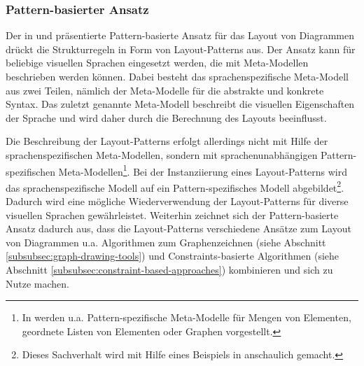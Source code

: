 


\subsubsection{Pattern-basierter Ansatz}

Der in \cite{Maier12A-Pattern-based} und \cite{MaierMinas10Combination} präsentierte Pattern-basierte Ansatz für das Layout von Diagrammen drückt die Strukturregeln in Form von Layout-Patterns aus. Der Ansatz kann für beliebige visuellen Sprachen eingesetzt werden, die mit Meta-Modellen beschrieben werden können. Dabei besteht das sprachenspezifische Meta-Modell aus zwei Teilen, nämlich der Meta-Modelle für die abstrakte und konkrete Syntax. Das zuletzt genannte Meta-Modell beschreibt die visuellen Eigenschaften der Sprache und wird daher durch die Berechnung des Layouts beeinflusst.

Die Beschreibung der Layout-Patterns erfolgt allerdings nicht mit Hilfe der sprachenspezifischen Meta-Modellen, sondern mit sprachenunabhängigen Pattern-spezifischen Meta-Model\-len\footnote{In \cite{Maier12A-Pattern-based} werden u.a. Pattern-spezifische Meta-Modelle für Mengen von Elementen, geordnete Listen von Elementen oder Graphen vorgestellt.}. Bei der Instanziierung eines Layout-Patterns wird das sprachenspezifische Modell auf ein Pattern-spezifisches Modell abgebildet\footnote{Dieses Sachverhalt wird mit Hilfe eines Beispiels in \cite[S.59ff]{Maier12A-Pattern-based} anschaulich gemacht.}. Dadurch wird eine mögliche Wiederverwendung der Layout-Patterns für diverse visuellen Sprachen gewährleistet. Weiterhin zeichnet sich der Pattern-basierte Ansatz dadurch aus, dass die Layout-Patterns verschiedene Ansätze zum Layout von Diagrammen u.a. Algorithmen zum Graphenzeichnen (siehe Abschnitt \ref{subsubsec:graph-drawing-tools}) und Constraints-basierte Algorithmen (siehe Abschnitt \ref{subsubsec:constraint-based-approaches}) kombinieren und sich zu Nutze machen.




